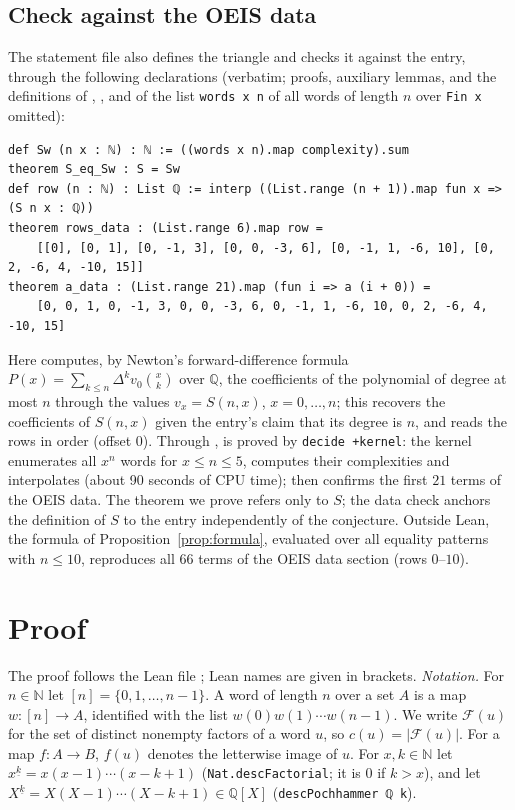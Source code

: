 \documentclass[11pt]{amsart}
\theoremstyle{plain}
\theoremstyle{definition}
\newcommand{\N}{\mathbb{N}}
\newcommand{\Q}{\mathbb{Q}}
\newcommand{\Fac}{\mathcal{F}}
\newcommand{\ff}[2]{#1^{\underline{#2}}}
\begin{document}
\subsection*{Check against the OEIS data}
The statement file also defines the triangle and checks it against the entry, through the following declarations (verbatim; proofs, auxiliary lemmas, and the definitions of , , and of the list \texttt{words x n} of all words of length $n$ over \texttt{Fin x} omitted):
\begin{lstlisting}
def Sw (n x : ℕ) : ℕ := ((words x n).map complexity).sum
theorem S_eq_Sw : S = Sw
def row (n : ℕ) : List ℚ := interp ((List.range (n + 1)).map fun x => (S n x : ℚ))
theorem rows_data : (List.range 6).map row =
    [[0], [0, 1], [0, -1, 3], [0, 0, -3, 6], [0, -1, 1, -6, 10], [0, 2, -6, 4, -10, 15]]
theorem a_data : (List.range 21).map (fun i => a (i + 0)) =
    [0, 0, 1, 0, -1, 3, 0, 0, -3, 6, 0, -1, 1, -6, 10, 0, 2, -6, 4, -10, 15]
\end{lstlisting}
Here  computes, by Newton's forward-difference formula $P(x)=\sum_{k\le n}\Delta^kv_0\binom xk$ over $\Q$, the coefficients of the polynomial of degree at most $n$ through the values $v_x=S(n,x)$, $x=0,\dots,n$; this recovers the coefficients of $S(n,x)$ given the entry's claim that its degree is $n$, and  reads the rows in order (offset $0$). Through ,  is proved by \texttt{decide +kernel}: the kernel enumerates all $x^n$ words for $x\le n\le5$, computes their complexities and interpolates (about 90 seconds of CPU time);  then confirms the first $21$ terms of the OEIS data. The theorem we prove refers only to $S$; the data check anchors the definition of $S$ to the entry independently of the conjecture. Outside Lean, the formula of Proposition~\ref{prop:formula}, evaluated over all equality patterns with $n\le10$, reproduces all $66$ terms of the OEIS data section (rows $0$--$10$).

\section{Proof}\label{sec:proof}

The proof follows the Lean file ; Lean names are given in brackets. \emph{Notation.} For $n\in\N$ let $[n]=\{0,1,\dots,n-1\}$. A word of length $n$ over a set $A$ is a map $w\colon[n]\to A$, identified with the list $w(0)w(1)\cdots w(n-1)$. We write $\Fac(u)$ for the set of distinct nonempty factors of a word $u$, so $c(u)=|\Fac(u)|$. For a map $f\colon A\to B$, $f(u)$ denotes the letterwise image of $u$. For $x,k\in\N$ let $\ff xk=x(x-1)\cdots(x-k+1)$ (\texttt{Nat.descFactorial}; it is $0$ if $k>x$), and let $\ff Xk=X(X-1)\cdots(X-k+1)\in\Q[X]$ (\texttt{descPochhammer ℚ k}).
\end{document}
